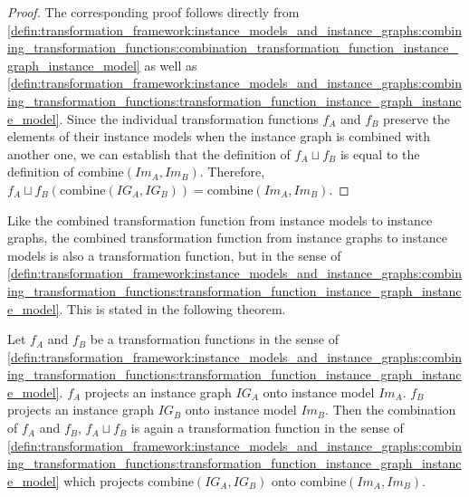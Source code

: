 \begin{proof}
The corresponding proof follows directly from \cref{defin:transformation_framework:instance_models_and_instance_graphs:combining_transformation_functions:combination_transformation_function_instance_graph_instance_model} as well as \cref{defin:transformation_framework:instance_models_and_instance_graphs:combining_transformation_functions:transformation_function_instance_graph_instance_model}. Since the individual transformation functions $f_A$ and $f_B$ preserve the elements of their instance models when the instance graph is combined with another one, we can establish that the definition of $f_{A} \sqcup f_{B}$ is equal to the definition of $\mathrm{combine}(Im_A, Im_B)$. Therefore, $f_{A} \sqcup f_{B}(\mathrm{combine}(IG_A, IG_B)) = \mathrm{combine}(Im_A, Im_B)$.
\end{proof}

Like the combined transformation function from instance models to instance graphs, the combined transformation function from instance graphs to instance models is also a transformation function, but in the sense of \cref{defin:transformation_framework:instance_models_and_instance_graphs:combining_transformation_functions:transformation_function_instance_graph_instance_model}. This is stated in the following theorem.

\begin{thm}
\label{defin:transformation_framework:instance_models_and_instance_graphs:combining_transformation_functions:imod_combine_mapping_function_correct}
Let $f_A$ and $f_B$ be a transformation functions in the sense of \cref{defin:transformation_framework:instance_models_and_instance_graphs:combining_transformation_functions:transformation_function_instance_graph_instance_model}. $f_A$ projects an instance graph $IG_A$ onto instance model $Im_A$. $f_B$ projects an instance graph $IG_B$ onto instance model $Im_B$. Then the combination of $f_A$ and $f_B$, $f_{A} \sqcup f_{B}$ is again a transformation function in the sense of \cref{defin:transformation_framework:instance_models_and_instance_graphs:combining_transformation_functions:transformation_function_instance_graph_instance_model} which projects $\mathrm{combine}(IG_A, IG_B)$ onto $\mathrm{combine}(Im_A, Im_B)$.
\end{thm}

